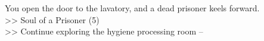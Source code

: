 You open the door to the lavatory, and a dead prisoner keels forward.\\
>> Soul of a Prisoner (5)\\

>> Continue exploring the hygiene processing room -- 
